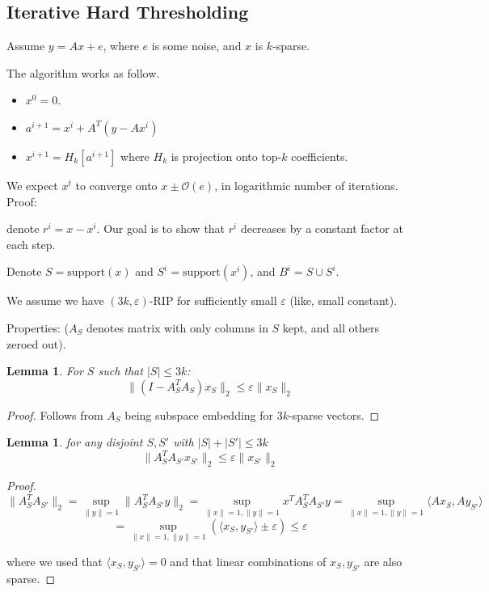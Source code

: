 \documentclass[11pt]{article}
\newtheorem{lemma}[theorem]{Lemma}
\newcommand{\bigo}{\mathcal{O}}
\begin{document}
\subsection{Iterative Hard Thresholding \cite{4960344}}

Assume $y = Ax+e$, where $e$ is some noise, and $x$ is $k$-sparse.

The algorithm works as follow. 
\begin{itemize}
\item $x^0 = 0$.
\item $a^{i+1} = x^i + A^T(y - Ax^i)$
\item $x^{i+1} = H_k[a^{i+1}]$ where $H_k$ is projection onto top-$k$ coefficients.
\end{itemize}

We expect $x^t$ to converge onto $x \pm \bigo(e)$, in logarithmic number of iterations.
Proof:

denote $r^i = x - x^i$.  Our goal is to show that $r^i$ decreases by a constant factor at each step.

Denote $S = \text{support}(x)$ and $S^i = \text{support}(x^i)$, and $B^i = S \cup S^i$.

We assume we have $(3k,\varepsilon)$-RIP for sufficiently small $\varepsilon$ (like, small constant).

Properties: ($A_S$ denotes matrix with only columns in $S$ kept, and all others zeroed out).
\begin{lemma}
For $S$ such that $|S| \le 3k$:
$$\|(I - A_S^T A_S)x_S\|_2 \le \varepsilon \|x_S\|_2$$
\end{lemma}
\begin{proof}
Follows from $A_S$ being subspace embedding for $3k$-sparse vectors.
\end{proof}

\begin{lemma}
for any disjoint $S,S'$ with $|S|+|S'| \le 3k$
$$\|A_S^TA_{S'}x_{S'}\|_2 \le \varepsilon \|x_{S'}\|_2$$
\end{lemma}
\begin{proof}
$$\|A_S^T A_{S'}\|_2 = \sup_{\|y\|=1} \|A_S^T A_{S'} y\|_2 = \sup_{\|x\|=1,\|y\|=1} x^T A_S^T A_{S'} y =  \sup_{\|x\|=1,\|y\|=1} \langle A x_S , A y_{S'} \rangle $$
$$=  \sup_{\|x\|=1,\|y\|=1} ( \langle x_S ,  y_{S'} \rangle \pm \varepsilon ) \le \varepsilon$$

where we used that $\langle x_S, y_{S'} \rangle = 0$ and that linear combinations of $x_S,y_{S'}$ are also sparse.
\end{proof}
\end{document}
